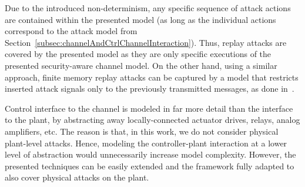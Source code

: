 \begin{remark}
Due to the introduced non-determinism, any specific sequence of attack actions are contained within the presented model (as long as the individual actions correspond to the attack model from Section~\ref{subsec:channelAndCtrlChannelInteraction}). Thus, replay attacks are covered by the presented model as they are only specific executions of the presented security-aware channel model. On the other hand, using a similar approach, finite memory replay attacks can be captured by a model that restricts inserted attack signals only to the previously transmitted messages, as done in~\cite{wang_arxiv19}.\QEDE
\end{remark}
\begin{remark}
Control interface to the channel is modeled in far more detail than the interface to the plant, by abstracting away locally-connected actuator drives, relays, analog amplifiers, etc. The reason is that, in this work, we do not consider physical plant-level attacks. Hence, modeling the controller-plant interaction at a lower level of abstraction would unnecessarily increase model complexity. However, the presented techniques can be easily extended and the framework fully adapted to also cover physical attacks on the plant.\QEDE
\end{remark}

















